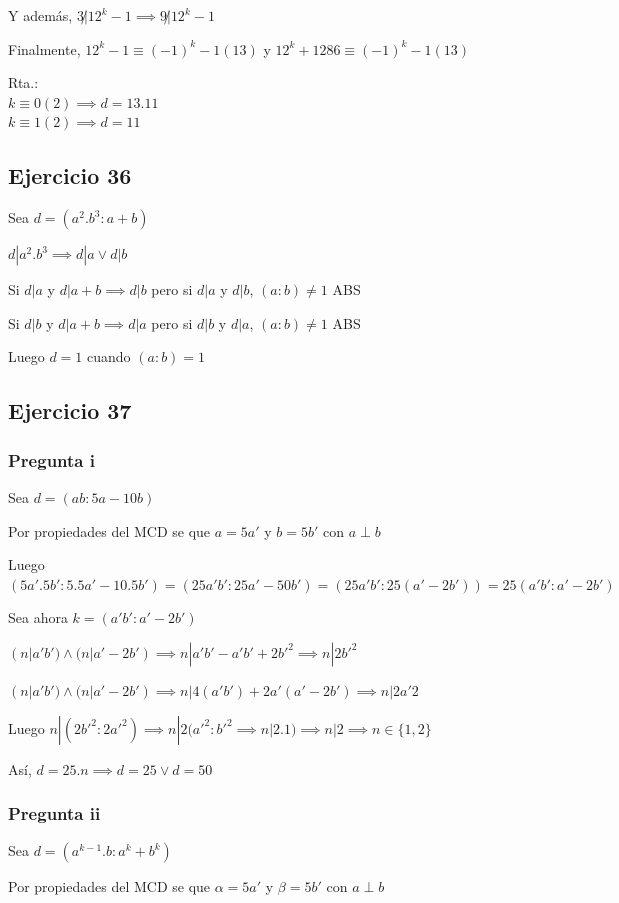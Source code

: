 Y además, $ 3\not | 12^k-1 \implies 9\not | 12^k-1 $

Finalmente, $ 12^k-1 \equiv (-1)^k - 1(13) $ y $ 12^k+1286 \equiv (-1)^k -1 (13) $

Rta.:\\
$ k \equiv 0(2) \implies d = 13.11 $ \\
$ k \equiv 1(2) \implies d = 11 $ 

\subsection{Ejercicio 36}
Sea $ d = (a^2.b^3:a+b)$

$ d|a^2.b^3 \implies d|a \vee d|b $

Si $ d|a $ y $ d|a+b \implies d|b $ pero si $ d|a $ y $ d|b $, $ (a:b) \neq 1 $ ABS

Si $ d|b $ y $ d|a+b \implies d|a $ pero si $ d|b $ y $ d|a $, $ (a:b) \neq 1 $ ABS

Luego $ d = 1 $ cuando $ (a:b) = 1 $

\subsection{Ejercicio 37}
\subsubsection{Pregunta i}
Sea $ d = (ab:5a-10b) $

Por propiedades del MCD se que $ a = 5a' $ y $ b = 5b' $ con $ a\perp b $

Luego $ (5a'.5b':5.5a'-10.5b') = (25a'b':25a'-50b') = (25a'b':25(a'-2b')) = 25(a'b':a'-2b') $

Sea ahora $ k = (a'b':a'-2b') $

$ (n|a'b') \wedge (n|a'-2b') \implies n|a'b'-a'b'+2b'^2 \implies n|2b'^2 $

$ (n|a'b') \wedge (n|a'-2b') \implies n|4(a'b')+2a'(a'-2b') \implies n|2a'2 $

Luego $ n|(2b'^2:2a'^2) \implies n|2(a'^2:b'^2 \implies n|2.1) \implies n|2 \implies n\in \{ 1,2 \} $

Así, $ d = 25.n \implies d = 25 \vee d = 50$

\subsubsection{Pregunta ii}
Sea $ d = (a^{k-1}.b:a^k+b^k) $

Por propiedades del MCD se que $ \alpha = 5a' $ y $ \beta = 5b' $ con $ a\perp b $

